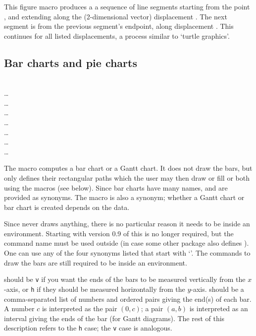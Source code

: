 \documentclass[letterpaper]{article}
\begin{document}
This figure macro produces a a sequence of line segments starting from
the point , and extending along the (2-dimen\-sional vector)
displacement . The next segment is from the previous
segment's endpoint, along displacement . This continues for
all listed displacements, a process similar to `turtle graphics'.


\subsection{Bar charts and pie charts}\label{charts}

\begin{cd}
%
  \\
\dots\\
\dots\\
\dots\\
\dots\\
\dots\\
\dots\\
\dots
{}%
%
%
%
\end{cd}

The macro  computes a bar chart or a Gantt chart. It does
not draw the bars, but only defines their rectangular paths which the
user may then draw or fill or both using the  macros (see
below). Since bar charts have many names,  and
 are provided as synonyms. The macro  is also a
synonym; whether a Gantt chart or bar chart is created depends on the
data.

Since  never draws anything, there is no particular reason
it needs to be inside an  environment. Starting with version
0.9 of \mfp{} this is no longer required, but the command name
 must be used outside (in case some other package also
defines ). One can use any of the four synonyms listed that
start with `'. The commands to draw the bars are still required to
be inside an  environment.

 should be \texttt{v} if you want the ends of the bars to
be measured vertically from the $x$-axis, or \texttt{h} if they should
be measured horizontally from the $y$-axis.  should be a
comma-separated list of numbers and ordered pairs giving the
end(s) of each bar. A number $c$ is interpreted as the pair $(0,c)$; a
pair $(a,b)$ is interpreted as an interval giving the ends of the bar
(for Gantt diagrams). The rest of this description refers to the
\texttt{h} case; the \texttt{v} case is analogous.
\end{document}
